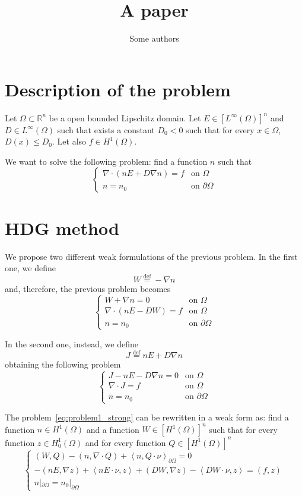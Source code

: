 \documentclass[a4paper,11pt, draft]{article}
\title{A paper}
\author{Some authors}
\newcommand{\Def}{\stackrel{\mathrm{def}}{=}}
\begin{document}
\section{Description of the problem}


Let $\Omega \subset \mathbb{R}^n$ be a open bounded Lipschitz domain. Let $E \in 
[L^{\infty}(\Omega)]^n$ and $D \in L^{\infty}(\Omega)$ such that exists a constant
$D_0 < 0 $ such that for every $x \in \Omega$, $D(x) \leq D_0$. Let also $f \in H^1(\Omega)$.

We want to solve the following problem: find a function $n$ such that
\[
 \begin{cases}
  \nabla \cdot \left(n E + D \nabla n \right) = f & \textrm{on } \Omega\\
  n = n_0 & \textrm{on } \partial \Omega
 \end{cases}
\]


\section{HDG method}
We propose two different weak formulations of the previous problem. In the first one, we define
\[ W \Def - \nabla n \]
and, therefore, the previous problem becomes
\begin{equation} \label{eq:problem1_strong}
 \begin{cases}
  W + \nabla n = 0 & \textrm{on } \Omega \\
  \nabla \cdot \left(n E - D W \right) = f & \textrm{on } \Omega\\
  n = n_0 & \textrm{on } \partial \Omega
 \end{cases}
\end{equation}

In the second one, instead, we define
\[ J \Def n E + D \nabla n \]
obtaining the following problem
\begin{equation}\label{eq:problem2_strong}
 \begin{cases}
  J - n E - D \nabla n = 0 & \textrm{on } \Omega \\
  \nabla \cdot J = f & \textrm{on } \Omega\\
  n = n_0 & \textrm{on } \partial \Omega
 \end{cases}
\end{equation}

The problem~\ref{eq:problem1_strong} can be rewritten in a weak form as: find a function $n \in
H^1(\Omega)$ and a function $W \in [H^1(\Omega)]^n$ such that for every function $z \in 
H^1_0(\Omega)$ and for every function $Q \in [H^1(\Omega)]^n$
\begin{equation} \label{eq:problem1_weak}
 \begin{cases}
  (W, Q) - (n, \nabla \cdot Q) + \left<n, Q \cdot \nu \right>_{\partial \Omega} = 0 \\
  - (n E, \nabla z) + \left<n E \cdot \nu, z \right> + (D W, \nabla z) - \left<D W \cdot \nu, 
z\right> = (f, z) \\
  n|_{\partial \Omega} = n_0 |_{\partial \Omega}
 \end{cases}
\end{equation}
\end{document}
